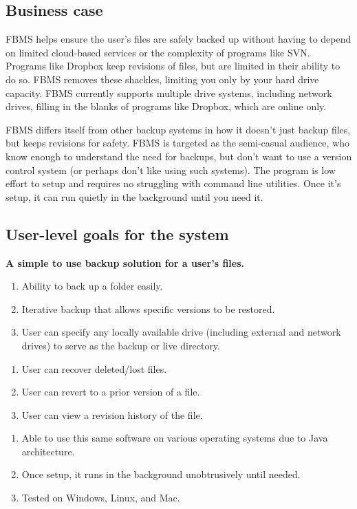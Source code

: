 \documentclass[12pt,a4paper]{article}
\begin{document}
\subsection{Business case}
FBMS helps ensure the user's files are safely backed up without having to depend on limited cloud-based services or the complexity of programs like SVN\cite{svn}. Programs like Dropbox\cite{dropbox} keep revisions of files, but are limited in their ability to do so. FBMS removes these shackles, limiting you only by your hard drive capacity. FBMS currently supports multiple drive systems, including network drives, filling in the blanks of programs like Dropbox, which are online only.

FBMS differs itself from other backup systems in how it doesn't just backup files, but keeps revisions for safety. FBMS is targeted as the semi-casual audience, who know enough to understand the need for backups, but don't want to use a version control system (or perhaps don't like using such systems). The program is low effort to setup and requires no struggling with command line utilities. Once it's setup, it can run quietly in the background until you need it.

\subsection{User-level goals for the system}
\textbf{A simple to use backup solution for a user's files.}
\begin{enumerate}
\item Ability to back up a folder easily.
\item Iterative backup that allows specific versions to be restored.
\item User can specify any locally available drive (including external and network drives) to serve as the backup or live directory.
\end{enumerate}

\begin{enumerate}
\item User can recover deleted/lost files.
\item User can revert to a prior version of a file.
\item User can view a revision history of the file.
\end{enumerate}

\begin{enumerate}
\item Able to use this same software on various operating systems due to Java architecture.
\item Once setup, it runs in the background unobtrusively until needed.
\item Tested on Windows, Linux, and Mac.
\end{enumerate}
\end{document}
